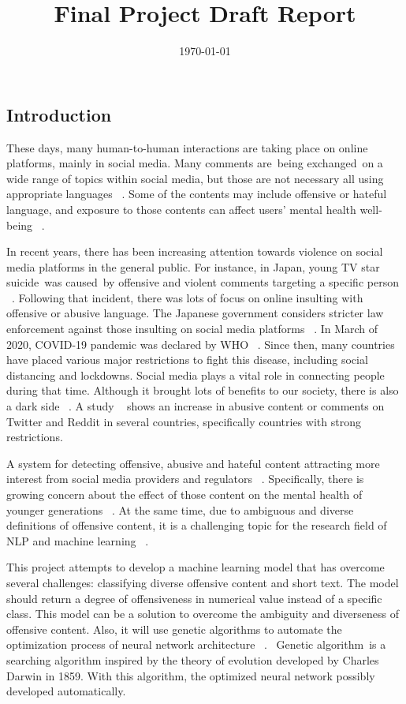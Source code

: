 \documentclass[11pt, natbib=false]{article}
\date{\today}
\title{Final Project Draft Report}
\begin{document}
\maketitle

\begin{multicols}{2}
\section{Introduction}
These days, many human-to-human interactions are taking place on online platforms, mainly in social media.
Many comments are being exchanged on a wide range of topics within social media, but those are not necessary all using appropriate languages ~\cite{hada2021ruddit}.
Some of the contents may include offensive or hateful language, and exposure to those contents can affect users’ mental health well-being ~\cite{hada2021ruddit}.

In recent years, there has been increasing attention towards violence on social media platforms in the general public.
For instance, in Japan, young TV star suicide was caused by offensive and violent comments targeting a specific person ~\cite{HanaK}.
Following that incident, there was lots of focus on online insulting with offensive or abusive language. The Japanese government considers stricter law enforcement against those insulting on social media platforms ~\cite{JpGov}.
In March of 2020, COVID-19 pandemic was declared by WHO ~\cite{whoCovid}.
Since then, many countries have placed various major restrictions to fight this disease, including social distancing and lockdowns. Social media plays a vital role in connecting people during that time. Although it brought lots of benefits to our society, there is also a dark side ~\cite{liu2021covid}.
A study ~\cite{babvey2021using} shows an increase in abusive content or comments on Twitter and Reddit in several countries, specifically countries with strong restrictions.

A system for detecting offensive, abusive and hateful content attracting more interest from social media providers and regulators ~\cite{vidgen2019challenges}.
Specifically, there is growing concern about the effect of those content on the mental health of younger generations ~\cite{babvey2021using}.
At the same time, due to ambiguous and diverse definitions of offensive content, it is a challenging topic for the research field of NLP and machine learning ~\cite{vidgen2019challenges}.

This project attempts to develop a machine learning model that has overcome several challenges: classifying diverse offensive content and short text.
The model should return a degree of offensiveness in numerical value instead of a specific class.
This model can be a solution to overcome the ambiguity and diverseness of offensive content.
Also, it will use genetic algorithms to automate the optimization process of neural network architecture ~\cite{andersen2021evolving}. 
Genetic algorithm is a searching algorithm inspired by the theory of evolution developed by Charles Darwin in 1859.
With this algorithm, the optimized neural network possibly developed automatically.


\end{multicols}
\end{document}
